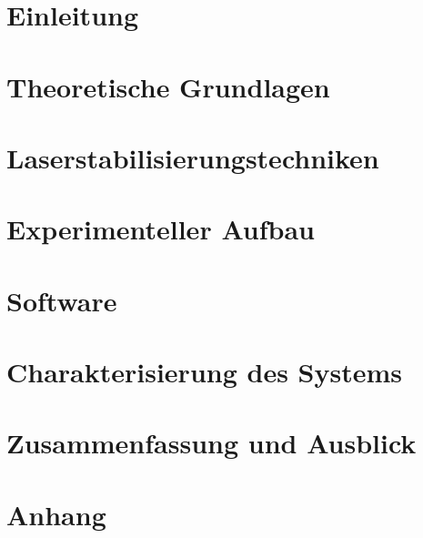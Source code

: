 \chapter{Einleitung}\label{kap:einleitung}

\chapter{Theoretische Grundlagen}\label{kap:theoretische_grundlagen}

\chapter{Laserstabilisierungstechniken}\label{kap:laserstabilisierungstechniken}

\chapter{Experimenteller Aufbau}\label{kap:experimenteller_aufbau}

\chapter{Software}\label{kap:software}
\chapter{Charakterisierung des Systems}\label{kap:charakterisierung}
\chapter{Zusammenfassung und Ausblick}\label{kap:zusammenfassung_und_ausblick}
\chapter*{Anhang}\label{kap:anhang}
\appendix
{}
